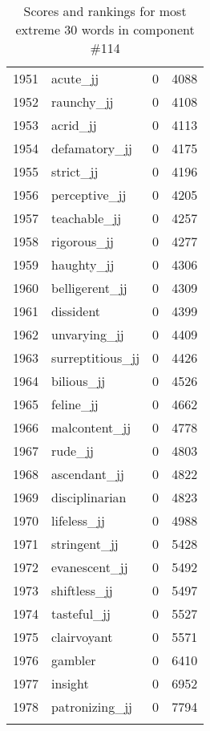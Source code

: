 \begin{longtable}[!htbp]{| rlr@{.}l |}
    1951 & acute\_jj & 0 & 4088 \\
    1952 & raunchy\_jj & 0 & 4108 \\
    1953 & acrid\_jj & 0 & 4113 \\
    1954 & defamatory\_jj & 0 & 4175 \\
    1955 & strict\_jj & 0 & 4196 \\
    1956 & perceptive\_jj & 0 & 4205 \\
    1957 & teachable\_jj & 0 & 4257 \\
    1958 & rigorous\_jj & 0 & 4277 \\
    1959 & haughty\_jj & 0 & 4306 \\
    1960 & belligerent\_jj & 0 & 4309 \\
    1961 & dissident & 0 & 4399 \\
    1962 & unvarying\_jj & 0 & 4409 \\
    1963 & surreptitious\_jj & 0 & 4426 \\
    1964 & bilious\_jj & 0 & 4526 \\
    1965 & feline\_jj & 0 & 4662 \\
    1966 & malcontent\_jj & 0 & 4778 \\
    1967 & rude\_jj & 0 & 4803 \\
    1968 & ascendant\_jj & 0 & 4822 \\
    1969 & disciplinarian & 0 & 4823 \\
    1970 & lifeless\_jj & 0 & 4988 \\
    1971 & stringent\_jj & 0 & 5428 \\
    1972 & evanescent\_jj & 0 & 5492 \\
    1973 & shiftless\_jj & 0 & 5497 \\
    1974 & tasteful\_jj & 0 & 5527 \\
    1975 & clairvoyant & 0 & 5571 \\
    1976 & gambler & 0 & 6410 \\
    1977 & insight & 0 & 6952 \\
    1978 & patronizing\_jj & 0 & 7794 \\
    \hline
    \caption{Scores and rankings for most extreme 30 words in component \#114} \\
\end{longtable}
